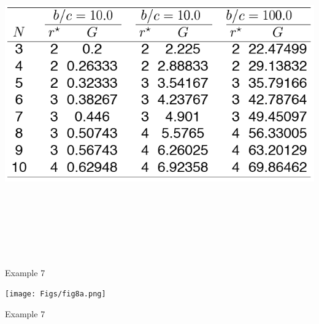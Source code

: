 \documentclass[12pt]{article}
\newcommand{\headsize}{\fontsize{35}{35} \selectfont}
\begin{document}
\centerline{\includegraphics[height=5.5in]{Figs/tableB.png}}


\newpage


\headsize \color{myyellow}
\hfill \begin{minipage}{5.75in}
\centering
Example 7
\end{minipage}

\vspace{30mm}

\centerline{\texttt{[image: Figs/fig8a.png]}}


\newpage


\headsize \color{myyellow}
\hfill \begin{minipage}{5.75in}
\centering
Example 7
\end{minipage}

\vspace{30mm}
\end{document}
